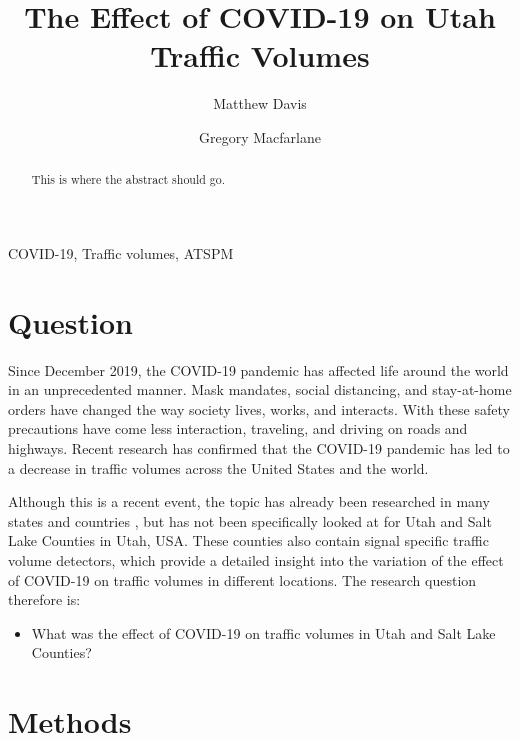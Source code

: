 \documentclass[3p, authoryear]{elsarticle} %
\providecommand{\tightlist}{%
  \setlength{\itemsep}{0pt}\setlength{\parskip}{0pt}}
\begin{document}
\begin{frontmatter}

  \title{The Effect of COVID-19 on Utah Traffic Volumes}
    \author[Brigham Young University]{Matthew Davis}
    \author[Brigham Young University]{Gregory Macfarlane}
      \address[Brigham Young University]{Civil and Environmental Engineering Department, 430 Engineering Building, Provo, Utah 84602}
  
  \begin{abstract}
  This is where the abstract should go.
  \end{abstract}
   \begin{keyword} COVID-19, Traffic volumes, ATSPM\end{keyword}
 \end{frontmatter}

\hypertarget{intro}{%
\section{Question}\label{intro}}

Since December 2019, the COVID-19 pandemic has affected life around the world in an unprecedented manner. Mask mandates, social distancing, and stay-at-home orders have changed the way society lives, works, and interacts. With these safety precautions have come less interaction, traveling, and driving on roads and highways. Recent research has confirmed that the COVID-19 pandemic has led to a decrease in traffic volumes across the United States and the world.

Although this is a recent event, the topic has already been researched in many states and countries \citep{Lee2020, Lee2021, Muley2021}, but has not been specifically looked at for Utah and Salt Lake Counties in Utah, USA. These counties also contain signal specific traffic volume detectors, which provide a detailed insight into the variation of the effect of COVID-19 on traffic volumes in different locations. The research question therefore is:

\begin{itemize}
\tightlist
\item
  What was the effect of COVID-19 on traffic volumes in Utah and Salt Lake Counties?
\end{itemize}

\hypertarget{methods}{%
\section{Methods}\label{methods}}
\end{document}
